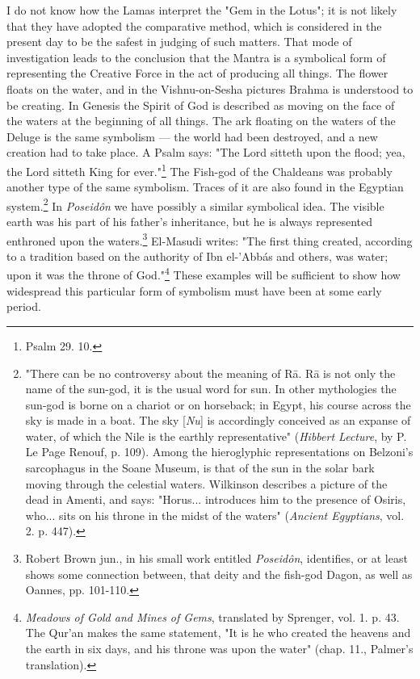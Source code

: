 \documentclass[a4paper, 11pt, oneside, polutonikogreek, english]{article}
\begin{document}
I do not know how the Lamas interpret the "Gem in the Lotus"; it is not likely that they have adopted the comparative method, which is considered in the present day to be the safest in judging of such matters. That mode of investigation leads to the conclusion that the Mantra is a symbolical form of representing the Creative Force in the act of producing all things. The flower floats on the water, and in the Vishnu-on-Sesha pictures Brahma is understood to be creating. In Genesis the Spirit of God is described as moving on the face of the waters at the beginning of all things. The ark floating on the waters of the Deluge is the same symbolism --- the world had been destroyed, and a new creation had to take place. A Psalm says: "The Lord sitteth upon the flood; yea, the Lord sitteth King for ever."\footnote{Psalm 29. 10.} The Fish-god of the Chaldeans was probably another type of the same symbolism. Traces of it are also found in the Egyptian system.\footnote{"There can be no controversy about the meaning of Rā. Rā is not only the name of the sun-god, it is the usual word for sun. In other mythologies the sun-god is borne on a chariot or on horseback; in Egypt, his course across the sky is made in a boat. The sky [\emph{Nu}] is accordingly conceived as an expanse of water, of which the Nile is the earthly representative" (\emph{Hibbert Lecture}, by P. Le Page Renouf, p. 109). Among the hieroglyphic representations on Belzoni's sarcophagus in the Soane Museum, is that of the sun in the solar bark moving through the celestial waters. Wilkinson describes a picture of the dead in Amenti, and says: "Horus... introduces him to the presence of Osiris, who... sits on his throne in the midst of the waters" (\emph{Ancient Egyptians}, vol. 2. p. 447).} In \emph{Poseidôn} we have possibly a similar symbolical idea. The visible earth was his part of his father's inheritance, but he is always represented enthroned upon the waters.\footnote{Robert Brown jun., in his small work entitled \emph{Poseidôn}, identifies, or at least shows some connection between, that deity and the fish-god Dagon, as well as Oannes, pp. 101-110.} El-Masudi writes: "The first thing created, according to a tradition based on the authority of Ibn el-'Abbás and others, was water; upon it was the throne of God."\footnote{\emph{Meadows of Gold and Mines of Gems}, translated by Sprenger, vol. 1. p. 43. The Qur'an makes the same statement, "It is he who created the heavens and the earth in six days, and his throne was upon the water" (chap. 11., Palmer's translation).} These examples will be sufficient to show how widespread this particular form of symbolism must have been at some early period.
\end{document}
